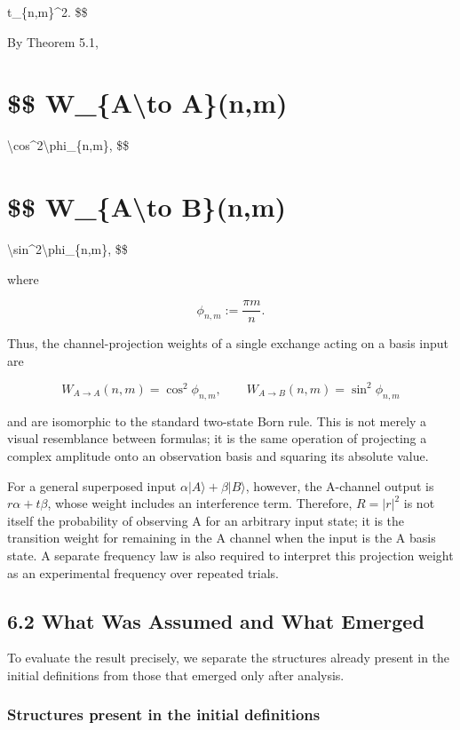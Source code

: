 \documentclass[
  a4paper,
  10pt]{article}
\begin{document}
\textbar t\_\{n,m\}\textbar\^{}2. \$\$

By Theorem 5.1,

\section{\$\$ W\_\{A\textbackslash to A\}(n,m)}\label{-w_ato-anm}

\textbackslash cos\^{}2\textbackslash phi\_\{n,m\}, \$\$

\section{\$\$ W\_\{A\textbackslash to B\}(n,m)}\label{-w_ato-bnm}

\textbackslash sin\^{}2\textbackslash phi\_\{n,m\}, \$\$

where

\[
\phi_{n,m}:=\frac{\pi m}{n}.
\]

Thus, the channel-projection weights of a single exchange acting on a
basis input are

\[
\boxed{
W_{A\to A}(n,m)=\cos^2\phi_{n,m},
\qquad
W_{A\to B}(n,m)=\sin^2\phi_{n,m}
}
\]

and are isomorphic to the standard two-state Born rule. This is not
merely a visual resemblance between formulas; it is the same operation
of projecting a complex amplitude onto an observation basis and squaring
its absolute value.

For a general superposed input \(\alpha|A\rangle+\beta|B\rangle\),
however, the A-channel output is \(r\alpha+t\beta\), whose weight
includes an interference term. Therefore, \(R=|r|^2\) is not itself the
probability of observing A for an arbitrary input state; it is the
transition weight for remaining in the A channel when the input is the A
basis state. A separate frequency law is also required to interpret this
projection weight as an experimental frequency over repeated trials.

\subsection{6.2 What Was Assumed and What
Emerged}\label{62-what-was-assumed-and-what-emerged}

To evaluate the result precisely, we separate the structures already
present in the initial definitions from those that emerged only after
analysis.

\subsubsection{Structures present in the initial
definitions}\label{structures-present-in-the-initial-definitions}
\end{document}
